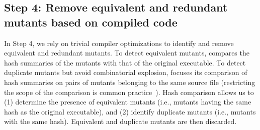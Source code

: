 

\subsection{Step 4: Remove equivalent and redundant mutants based on compiled code}

In Step 4, we rely on trivial compiler optimizations to identify and remove equivalent and redundant mutants.
To detect equivalent mutants, \APPR compares the hash summaries of the mutants with that of the original executable. To detect duplicate mutants but avoid combinatorial explosion, \APPR focuses its comparison of hash summaries on pairs of mutants belonging to the same source file (restricting the scope of the comparison is common practice~\cite{kintis2017detecting}).
Hash comparison allows us to (1) determine the presence of equivalent mutants (i.e., mutants having the same hash as the original executable), and (2) identify duplicate mutants (i.e., mutants with the same hash). %
Equivalent and duplicate mutants are then discarded.

